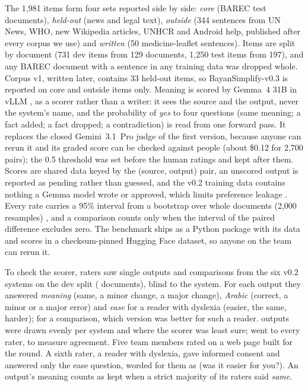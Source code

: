 \documentclass[10pt,a4paper]{article}
\newcommand{\vThree}{BayanSimplify-v0.3}
\begin{document}
The 1,981 items form four sets reported side by side: \emph{core} (BAREC test
documents), \emph{held-out} (news and legal text), \emph{outside} (344 sentences
from UN News, WHO, new Wikipedia articles, UNHCR and Android help, published after
every corpus we use) and \emph{written} (50 medicine-leaflet sentences). Items are
split by document (731 dev items from 129 documents, 1,250 test items from 197),
and any BAREC document with a sentence in any training data was dropped whole.
Corpus v1, written later, contains 33 held-out items, so \vThree{} is reported on
core and outside items only.
Meaning is scored by Gemma~4 31B \cite{gemma4} in vLLM \cite{vllm}, as a scorer
rather than a writer: it sees the source and the output, never the system's name,
and the probability of \emph{yes} to four questions (same meaning; a fact added;
a fact dropped; a contradiction) is read from one forward pass. It replaces the
closed Gemini~3.1~Pro judge of the first version, because anyone can rerun it and
its graded score can be checked against people (about \$0.12 for 2,700 pairs); the
0.5 threshold was set before the human ratings and kept after them. Scores are
shared data keyed by the (source, output) pair, an unscored output is reported as
pending rather than guessed, and the v0.2 training data contains nothing a Gemma
model wrote or approved, which limits preference leakage \cite{li2026}. Every rate carries a 95\% interval from a
bootstrap over whole documents (2,000 resamples) \cite{miller2024}, and a
comparison counts only when the interval of the paired difference excludes zero.
The benchmark ships as a Python package with its data and scores in a
checksum-pinned Hugging Face dataset, so anyone on the team can rerun it.

 To check the scorer, raters saw
\hSingles{} single outputs and \hPairs{} comparisons from the six v0.2 systems on
the dev split (\hDocs{} documents), blind to the system. For each output they
answered \emph{meaning} (same, a minor change, a major change), \emph{Arabic}
(correct, a minor or a major error) and \emph{ease} for a reader with dyslexia
(easier, the same, harder); for a comparison, which version was better for such a
reader. \hEven{} outputs were drawn evenly per system and \hNear{} where the
scorer was least sure; \hShared{} went to every rater, to measure agreement. Five
team members rated on a web page built for the round. A sixth rater, a reader with
dyslexia, gave informed consent and answered only the ease question, worded for
them as \mbox{} (was it easier for you?). An output's
meaning counts as kept when a strict majority of its raters said \emph{same}.
\end{document}
